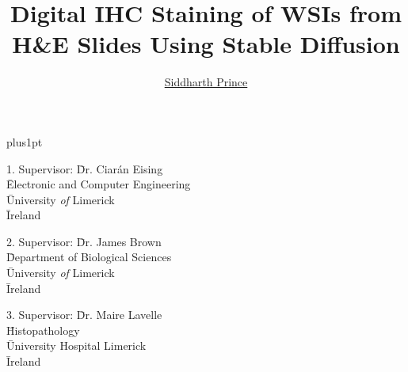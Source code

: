 \documentclass[oneside,12pt]{Latex/Classes/PhDthesisPSnPDF}
\title{Digital IHC Staining of WSIs from
H\&E Slides Using Stable Diffusion}
\author{\href{mailto: sprince.ie.31@gmail.com}{Siddharth Prince}}
\begin{document}



\renewcommand\baselinestretch{1.2}
\baselineskip=18pt plus1pt



\maketitle  %



\newpage


 \begin{tabbing}
1.  Supervisor: \= Dr. Ciarán Eising    \\
 \>  \= Electronic and Computer Engineering\\
 \>  \= University \emph{of} Limerick \\
 \>  \= Ireland \\
 \end{tabbing}


 \begin{tabbing}
2. Supervisor: \= Dr. James Brown \\
 \>  \= Department of Biological Sciences \\
 \>  \= University \emph{of} Limerick \\
 \>  \= Ireland \\
\end{tabbing}

\begin{tabbing}
3. Supervisor: \= Dr. Maire Lavelle \\
 \>  \= Histopathology \\
 \>  \= University Hospital Limerick \\
 \>  \= Ireland \\
\end{tabbing}


\vspace{10mm}




\end{document}
